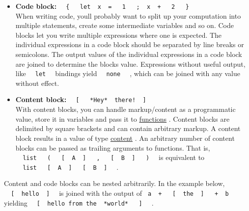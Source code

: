 \begin{itemize}
\item
  \textbf{Code block:}
  \texttt{\ }{\texttt{\ \{\ }}\texttt{\ }{\texttt{\ let\ }}\texttt{\ x\ }{\texttt{\ =\ }}\texttt{\ }{\texttt{\ 1\ }}\texttt{\ }{\texttt{\ ;\ }}\texttt{\ x\ }{\texttt{\ +\ }}\texttt{\ }{\texttt{\ 2\ }}\texttt{\ }{\texttt{\ \}\ }}\texttt{\ }\\
  When writing code, you\textquotesingle ll probably want to split up
  your computation into multiple statements, create some intermediate
  variables and so on. Code blocks let you write multiple expressions
  where one is expected. The individual expressions in a code block
  should be separated by line breaks or semicolons. The output values of
  the individual expressions in a code block are joined to determine the
  block\textquotesingle s value. Expressions without useful output, like
  \texttt{\ }{\texttt{\ let\ }}\texttt{\ } bindings yield
  \texttt{\ }{\texttt{\ none\ }}\texttt{\ } , which can be joined with
  any value without effect.
\item
  \textbf{Content block:}
  \texttt{\ }{\texttt{\ {[}\ }}\texttt{\ }{\texttt{\ *Hey*\ }}\texttt{\ there!\ }{\texttt{\ {]}\ }}\texttt{\ }\\
  With content blocks, you can handle markup/content as a programmatic
  value, store it in variables and pass it to
  \href{/docs/reference/foundations/function/}{functions} . Content
  blocks are delimited by square brackets and can contain arbitrary
  markup. A content block results in a value of type
  \href{/docs/reference/foundations/content/}{content} . An arbitrary
  number of content blocks can be passed as trailing arguments to
  functions. That is,
  \texttt{\ }{\texttt{\ list\ }}\texttt{\ }{\texttt{\ (\ }}\texttt{\ }{\texttt{\ {[}\ }}\texttt{\ A\ }{\texttt{\ {]}\ }}\texttt{\ }{\texttt{\ ,\ }}\texttt{\ }{\texttt{\ {[}\ }}\texttt{\ B\ }{\texttt{\ {]}\ }}\texttt{\ }{\texttt{\ )\ }}\texttt{\ }
  is equivalent to
  \texttt{\ }{\texttt{\ list\ }}\texttt{\ }{\texttt{\ {[}\ }}\texttt{\ A\ }{\texttt{\ {]}\ }}\texttt{\ }{\texttt{\ {[}\ }}\texttt{\ B\ }{\texttt{\ {]}\ }}\texttt{\ }
  .
\end{itemize}

Content and code blocks can be nested arbitrarily. In the example below,
\texttt{\ }{\texttt{\ {[}\ }}\texttt{\ hello\ }{\texttt{\ {]}\ }}\texttt{\ }
is joined with the output of
\texttt{\ a\ }{\texttt{\ +\ }}\texttt{\ }{\texttt{\ {[}\ }}\texttt{\ the\ }{\texttt{\ {]}\ }}\texttt{\ }{\texttt{\ +\ }}\texttt{\ b\ }
yielding
\texttt{\ }{\texttt{\ {[}\ }}\texttt{\ hello\ from\ the\ }{\texttt{\ *world*\ }}\texttt{\ }{\texttt{\ {]}\ }}\texttt{\ }
.

